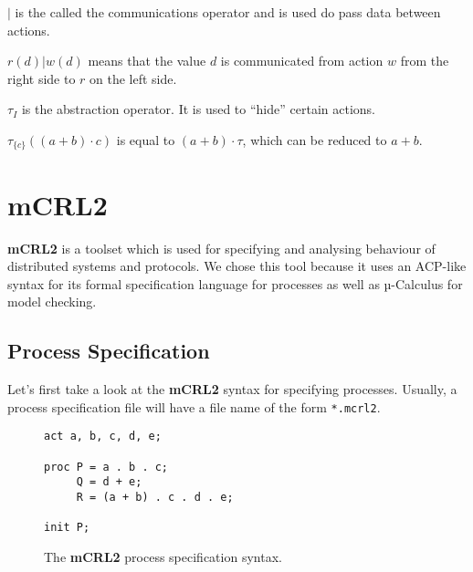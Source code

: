 \documentclass{clseminar}
\begin{document}
  $|$ is the called the communications operator and is used do pass data between actions.
  \\
  \begin{example}
     $r(d) | w(d)$ means that the value $d$ is communicated from action $w$ from the right side to $r$ on the left side.
  \end{example}

  $\tau_I$ is the abstraction operator. It is used to “hide” certain actions.
  \\
  \begin{example}
    $\tau_{\{c\}}((a+b)\cdot c)$ is equal to $(a + b) \cdot \tau$, which can be reduced to $a + b$.
  \end{example}

  \section{mCRL2}

  \textbf{mCRL2} is a toolset which is used for specifying and analysing behaviour of distributed systems and protocols. We chose this tool because it uses an ACP-like syntax for its formal specification language for processes as well as µ-Calculus for model checking.

  \subsection{Process Specification}

  Let's first take a look at the \textbf{mCRL2} syntax for specifying processes. Usually, a process specification file will have a file name of the form \texttt{*.mcrl2}.

  \begin{figure}[!ht]
    \begin{lstlisting}[language=mCRL2]
act a, b, c, d, e;

proc P = a . b . c;
     Q = d + e;
     R = (a + b) . c . d . e;

init P;
    \end{lstlisting}
    \caption{The \textbf{mCRL2} process specification syntax.}
    \label{fig:mcrl2_syntax}
  \end{figure}
\end{document}
